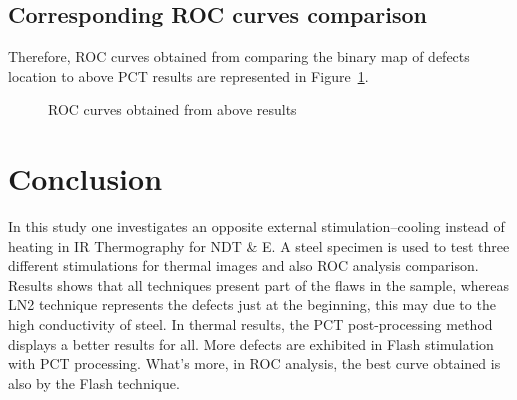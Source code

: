 \documentclass[]{spie}  %
\begin{document}
\subsection{Corresponding ROC curves comparison}
Therefore, ROC curves obtained from comparing the binary map of defects location to above PCT results are represented in Figure~\ref{ROC_curve}.
\begin{figure}[ht]
    \centering
    \hspace{10pt}
    \caption{ROC curves obtained from above results}
    \label{ROC_curve}
\end{figure}





\section{Conclusion} %
\label{sec:conclusion}
In this study one investigates an opposite external stimulation--cooling instead of heating in IR Thermography for NDT \& E. 
A steel specimen is used to test three different stimulations for thermal images and also ROC analysis comparison. 
Results shows that all techniques present part of the flaws in the sample, whereas LN2 technique represents the defects just at the beginning, this may due to the high conductivity of steel. 
In thermal results, the PCT post-processing method displays a better results for all. More defects are exhibited in Flash stimulation with PCT processing.
What's more, in ROC analysis, the best curve obtained is also by the Flash technique.




\end{document}
